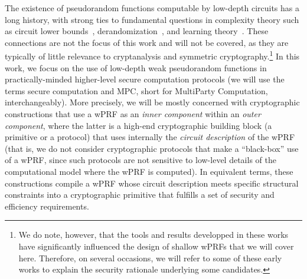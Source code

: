 \documentclass[journal=tosc,submission]{iacrtrans}
\theoremstyle{theorem}
\newcommand\gc[1]{\textcolor{olive!80}{\textbf{Geoffroy:} #1}}
\newcommand\yr[1]{\textcolor{brown!80}{\textbf{Yann:} #1}}
\begin{document}
The existence of pseudorandom functions computable by low-depth circuits has a long history, with strong ties to fundamental questions in complexity theory such as circuit lower bounds~\cite{STOC:RazRud94,C:MilVio12,SerVio12}, derandomization~\cite{FOCS:NisWig88,STOC:Williams13}, and learning theory~\cite{valiant1984theory,kearns1994cryptographic,C:BCGIKS21}. These connections are not the focus of this work and will not be covered, as they are typically of little relevance to cryptanalysis and symmetric cryptography.\footnote{We do note, however, that the tools and results developped in these works have significantly influenced the design of shallow wPRFs that we will cover here. Therefore, on several occasions, we will refer to some of these early works to explain the security rationale underlying some candidates.} In this work, we focus on the use of low-depth weak pseudorandom functions in practically-minded higher-level secure computation protocols (we will use the terms secure computation and MPC, short for MultiParty Computation, interchangeably). More precisely, we will be mostly concerned with cryptographic constructions that use a wPRF as an \emph{inner component} within an \emph{outer component}, where the latter is a high-end cryptographic building block (a primitive or a protocol) that uses internally the \emph{circuit description} of the wPRF (that is, we do not consider cryptographic protocols that make a ``black-box'' use of a wPRF, since such protocols are not sensitive to low-level details of the computational model where the wPRF is computed). In equivalent terms, these constructions compile a wPRF whose circuit description meets specific structural constraints into a cryptographic primitive that fulfills a set of security and efficiency requirements.



\end{document}
